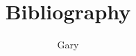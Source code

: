 \documentclass[a4paper, twocolumn]{article}
\title{Bibliography}
\date{}
\author{Gary}
\begin{document}
 
\maketitle	 
 
\begin{abstract}
	\lipsum[1]
\end{abstract}
 
\tableofcontents
\end{document}
